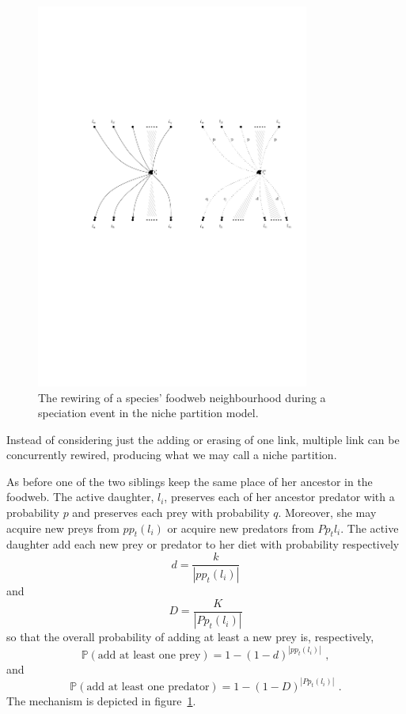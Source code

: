 \documentclass[12pt,a4paper]{report}
\begin{document}
\begin{figure}[ht]
	\centering
		\includegraphics[width=0.8\textwidth]{images/fwspec2p}
		\caption{The rewiring of a species' foodweb neighbourhood during a speciation event in the niche partition model.}
		\label{fig:fwspec2p}
\end{figure}

Instead of considering just the adding or erasing of one link, multiple link can be concurrently rewired, producing what we may call a niche partition.

As before one of the two siblings keep the same place of her ancestor in the foodweb. The active daughter, $l_i$, preserves each of her ancestor predator with a probability $p$ and preserves each prey with probability $q$. Moreover, she may acquire new preys from $pp_{t}(l_i)$ or acquire new predators from $Pp_t{l_i}$. The active daughter add each new prey or predator to her diet with probability respectively $$d = \frac{k}{|pp_t(l_i)|}$$ and $$D = \frac{K}{|Pp_t(l_i)|}$$  so that the overall probability of adding at least a new prey is, respectively, \[ \mathbb{P}(\mbox{add at least one prey}) = 1 - \left( 1 - d\right)^{|pp_t(l_i)|} \, \, , \] and \[ \mathbb{P}(\mbox{add at least one predator}) = 1 - \left( 1 - D\right)^{|Pp_t(l_i)|} \, \, . \]   The mechanism is depicted in figure~\ref{fig:fwspec2p}.
\end{document}
